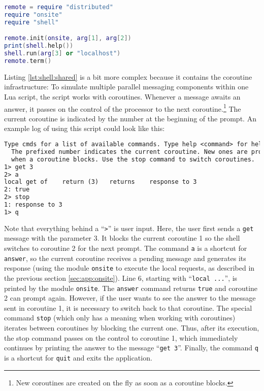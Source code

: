 \begin{appendices}
\begin{lstlisting}[language=lua, caption={A script starting \texttt{distributed} messaging and running a \texttt{shell}}, label=lst:shell:distributed, name=lst:shell:distributed]
remote = require "distributed"
require "onsite"
require "shell"

remote.init(onsite, arg[1], arg[2])
print(shell.help())
shell.run(arg[3] or "localhost")
remote.term()
\end{lstlisting}

Listing \ref{lst:shell:shared} is a bit more complex because it contains the coroutine infrastructure: To simulate multiple parallel messaging components within one Lua script, the script works with coroutines. Whenever a message awaits an answer, it passes on the control of the processor to the next coroutine.\footnote{New coroutines are created on the fly as soon as a coroutine blocks.} The current coroutine is indicated by the number at the beginning of the prompt. An example log of using this script could look like this:

\begin{lstlisting}[language=tex, caption={A log from using the script of listing \ref{lst:shell:shared}}, label=lst:shell:sharedlog, name=lst:shell:sharedlog]
  Type cmds for a list of available commands. Type help <command> for help.
  The prefixed number indicates the current coroutine. New ones are produced on the fly
  when a coroutine blocks. Use the stop command to switch coroutines.
1> get 3
2> a
local get of 	return (3)	 returns 	response to 3
2: true
2> stop
1: response to 3
1> q
\end{lstlisting}

Note that everything behind a ``\texttt{>}'' is user input. Here, the user first sends a \texttt{get} message with the parameter 3. It blocks the current coroutine 1 so the shell switches to coroutine 2 for the next prompt. The command \texttt{a} is a shortcut for \texttt{answer}, so the current coroutine receives a pending message and generates its response (using the module \texttt{onsite} to execute the local requests, as described in the previous section \ref{sec:app:onsite}). Line 6, starting with ``\texttt{local ...}'', is printed by the module \texttt{onsite}. The \texttt{answer} command returns \texttt{true} and coroutine 2 can prompt again. However, if the user wants to see the answer to the message sent in coroutine 1, it is necessary to switch back to that coroutine. The special command \texttt{stop} (which only has a meaning when working with coroutines) iterates between coroutines by blocking the current one. Thus, after its execution, the stop command passes on the control to coroutine 1, which immediately continues by printing the answer to the message ``\texttt{get 3}''. Finally, the command \texttt{q} is a shortcut for \texttt{quit} and exits the application.


\end{appendices}
